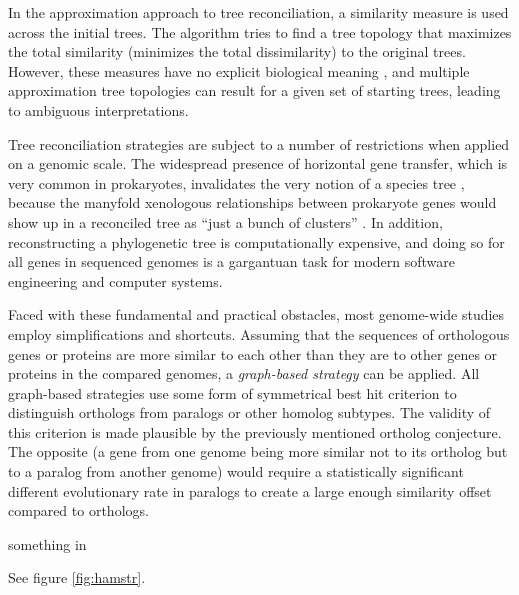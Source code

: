 In the approximation approach to tree reconciliation, a similarity measure is
used across the initial trees. The algorithm tries to find a tree topology that
maximizes the total similarity (minimizes the total dissimilarity) to the
original trees. However, these measures have no explicit biological meaning
\citep{mirkin1995}, and multiple approximation tree topologies can result for a
given set of starting trees, leading to ambiguous interpretations. 

Tree reconciliation strategies are subject to a number of restrictions when
applied on a genomic scale. The widespread presence of horizontal gene
transfer, which is very common in prokaryotes, invalidates the very notion of a
species tree \citet{doolittle2000}, because the manyfold xenologous
relationships between prokaryote genes would show up in a reconciled tree as
``just a bunch of clusters'' . In addition, reconstructing a
phylogenetic tree is computationally expensive, and doing so for all genes in
sequenced genomes is a gargantuan task for modern software engineering and
computer systems.

Faced with these fundamental and practical obstacles, most genome-wide
studies employ simplifications and shortcuts. Assuming that the sequences of
orthologous genes or proteins are more similar to each other than they are to
other genes or proteins in the compared genomes, a \emph{graph-based strategy}
can be applied. All graph-based strategies use some form of symmetrical best hit
criterion to distinguish orthologs from paralogs or other homolog subtypes. The
validity of this criterion is made plausible by the previously mentioned
ortholog conjecture. The opposite (a gene from one genome being more similar not
to its ortholog but to a paralog from another genome) would require a
statistically significant different evolutionary rate in paralogs to create a
large enough similarity offset compared to orthologs.

something in \citet{page1997}



See figure \ref{fig:hamstr}.
